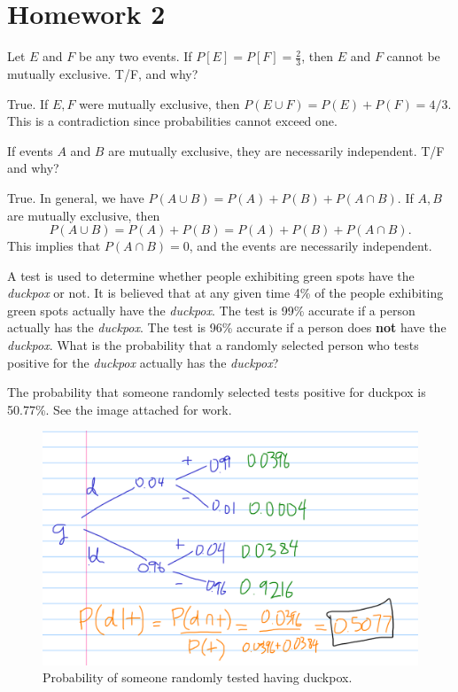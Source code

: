 \section{Homework 2} 
\begin{prob}
    Let $E$ and $F$ be any two events. If $P[E] = P[F] = \frac{2}{3}$, then $E$ and $F$ cannot be mutually exclusive. T/F, and why?
\end{prob}
\begin{solution}
    True. If $E,F$ were mutually exclusive, then $P(E \cup F)=P(E)+P(F)= 4/3$. This is a contradiction since probabilities cannot exceed one.
\end{solution}

\begin{prob}
    If events $A$ and $B$ are mutually exclusive, they are necessarily independent. T/F and why?
\end{prob}
\begin{solution}
    True. In general, we have $P(A \cup B)=P(A)+P(B)+P(A\cap B)$. If $A,B$ are mutually exclusive, then \[
        P(A\cup B)=P(A) +P(B)=P(A )+P(B)+P(A \cap B).
    \] This implies that $P(A \cap B)=0$, and the events are necessarily independent.
\end{solution}
\begin{prob}
    A test is used to determine whether people exhibiting green spots have the \emph{duckpox} or not. It is believed that at any given time 4\% of the people exhibiting green spots actually have the \emph{duckpox}. The test is 99\% accurate if a person actually has the \emph{duckpox}. The test is 96\% accurate if a person does \textbf{not} have the \emph{duckpox}. What is the probability that a randomly selected person who tests positive for the \emph{duckpox} actually has the \emph{duckpox}?
\end{prob}
\begin{solution}
    The probability that someone randomly selected tests positive for duckpox is 50.77\%. See the image attached for work. 
    \begin{figure}[H]
    \centering
     \includegraphics[width=0.6\linewidth]{hw_figures/hw2_duckpox.png}
    \caption{Probability of someone randomly tested having duckpox.}
    \label{hw2_duckpox}
    \end{figure}
\end{solution}
